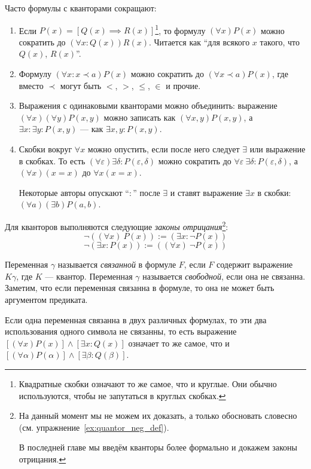 Часто формулы с кванторами сокращают:
\begin{enumerate}
	\item{}Если ${P(x)=[Q(x)\implies R(x)]}$\footnote{Квадратные скобки означают то же самое,
		что и круглые. Они обычно используются, чтобы не запутаться в круглых скобках.},
	то формулу ${(\forall x)P(x)}$ можно сократить
	до ${(\forall x:Q(x))R(x)}$. Читается как ``для всякого $x$ такого, что
	$Q(x)$, $R(x)$''.
	\item{}Формулу $(\forall x:x\prec a)P(x)$ можно сократить до $(\forall x\prec a)P(x)$,
	где вместо $\prec$ могут быть $<$, $>$, $\leq$, $\in$ и прочие.
	\item{}Выражения с одинаковыми кванторами можно объединить:
	выражение $(\forall x)(\forall y)P(x,y)$ можно записать как $(\forall x,y)P(x,y)$,
	а $\exists x:\exists y:P(x,y)$ --- как $\exists x,y:P(x,y)$.
	\item{}Скобки вокруг $\forall x$ можно опустить, если после него следует $\exists$ или
	выражение в скобках.
	То есть ${(\forall \varepsilon)\exists \delta:P(\varepsilon,\delta)}$
	можно сократить до $\forall \varepsilon~\exists \delta:P(\varepsilon,\delta)$,
	а $(\forall x)(x=x)$ до $\forall x(x=x)$.

	Некоторые авторы опускают ``$:$'' после $\exists$ и ставят выражение $\exists x$ в
	скобки: $(\forall a)(\exists b)P(a,b)$.
\end{enumerate}

Для кванторов выполняются следующие {\it законы отрицания}\footnote{
	На данный момент мы не можем их доказать, а только
	обосновать словесно (см. упражнение~\ref{ex:quantor_neg_def}).

	В последней главе мы введём кванторы более формально и докажем законы отрицания.}:
\[
	\lnot((\forall x)~P(x)):=(\exists x:\lnot P(x))
\]
\[
	\lnot(\exists x:P(x)):=((\forall x)~\lnot P(x))
\]

Переменная $\gamma$ называется {\it связанной} в формуле $F$, если $F$
содержит выражение $K\gamma$, где $K$ --- квантор.
Переменная $\gamma$ называется {\it свободной}, если она не связанна.
Заметим, что если переменная связанна в формуле, то она не может быть
аргументом предиката.

Если одна переменная связанна в двух различных формулах,
то эти два использования одного символа не связанны, то есть
выражение ${[(\forall x)P(x)]\land[\exists x:Q(x)]}$ означает то же самое, что
и $[(\forall \alpha)P(\alpha)]\land[\exists \beta:Q(\beta)]$.

\pagebreak

